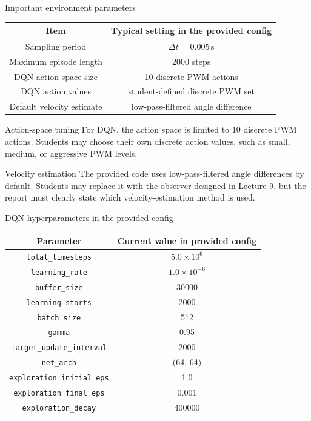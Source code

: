 \documentclass[aspectratio=169]{beamer}
\begin{document}
\begin{frame}{Important environment parameters}
\begin{center}
\begin{tabular}{c|c}
\hline
Item & Typical setting in the provided config \\
\hline
Sampling period & $\Delta t=0.005\,\mathrm{s}$ \\
Maximum episode length & 2000 steps \\
DQN action space size & 10 discrete PWM actions \\
DQN action values & student-defined discrete PWM set \\
Default velocity estimate & low-pass-filtered angle difference \\


\hline
\end{tabular}
\end{center}



\begin{block}{Action-space tuning}
\small
For DQN, the action space is limited to 10 discrete PWM actions.
Students may choose their own discrete action values, such as small, medium, or aggressive PWM levels.
\end{block}



\begin{alertblock}{Velocity estimation}
\small
The provided code uses low-pass-filtered angle differences by default.
Students may replace it with the observer designed in Lecture 9, but the report must clearly state which velocity-estimation method is used.
\end{alertblock}

\end{frame}
\begin{frame}{DQN hyperparameters in the provided config}
\begin{center}
\begin{tabular}{c|c}
\hline
Parameter & Current value in provided config \\
\hline
\texttt{total\_timesteps} & $5.0\times 10^6$ \\
\texttt{learning\_rate} & $1.0\times 10^{-6}$ \\
\texttt{buffer\_size} & 30000 \\
\texttt{learning\_starts} & 2000 \\
\texttt{batch\_size} & 512 \\
\texttt{gamma} & 0.95 \\
\texttt{target\_update\_interval} & 2000 \\
\texttt{net\_arch} & (64, 64) \\
\texttt{exploration\_initial\_eps} & 1.0 \\
\texttt{exploration\_final\_eps} & 0.001 \\
\texttt{exploration\_decay} & 400000 \\
\hline
\end{tabular}
\end{center}
\end{frame}
\end{document}

